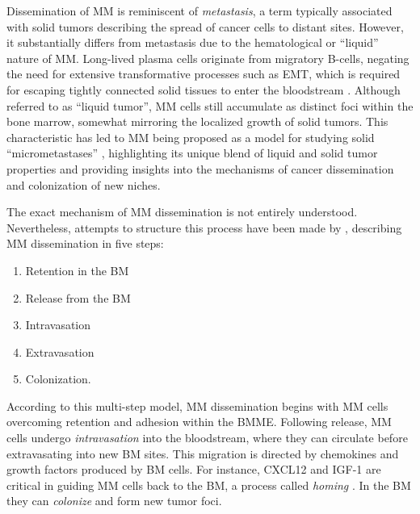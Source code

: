 Dissemination of \ac{MM} is reminiscent of \emph{metastasis}, a
term typically associated with solid tumors describing the spread of cancer
cells to distant sites. However, it substantially differs from metastasis due to
the hematological or ``liquid'' nature of \ac{MM}. Long-lived plasma cells originate
from migratory B-cells, negating the need for extensive transformative processes
such as \ac{EMT}, which is required for
escaping tightly connected solid tissues to enter the bloodstream
\cite{ribattiEpithelialMesenchymalTransitionCancer2020}. Although referred to as
``liquid tumor'', \ac{MM} cells still accumulate as distinct foci within the bone
marrow, somewhat mirroring the localized growth of solid tumors. This
characteristic has led to \ac{MM} being proposed as a model for studying solid
``micrometastases'' \cite{ghobrialMyelomaModelProcess2012}, highlighting its
unique blend of liquid and solid tumor properties and providing insights into
the mechanisms of cancer dissemination and colonization of new niches.

The exact mechanism of \ac{MM} dissemination is not entirely understood.
Nevertheless, attempts to structure this process have been made by
\citet{zeissigTumourDisseminationMultiple2020}, describing \ac{MM} dissemination in
five steps:
\begin{enumerate}
    \item Retention in the \ac{BM}
    \item Release from the \ac{BM}
    \item Intravasation
    \item Extravasation
    \item Colonization.
\end{enumerate}


According to this multi-step model, \ac{MM}
dissemination begins with \ac{MM} cells overcoming retention and adhesion within
the \ac{BMME}. Following release, \ac{MM} cells undergo \emph{intravasation}
into the bloodstream, where they can circulate before extravasating into new
\ac{BM} sites. This migration is directed by chemokines and growth factors
produced by \ac{BM} cells. For instance, CXCL12 and IGF-1 are critical in
guiding \ac{MM} cells back to the \ac{BM}, a process called \emph{homing}
\cite{vandebroekExtravasationHomingMechanisms2008}. In the \ac{BM} they can
\emph{colonize} and form new tumor foci.


